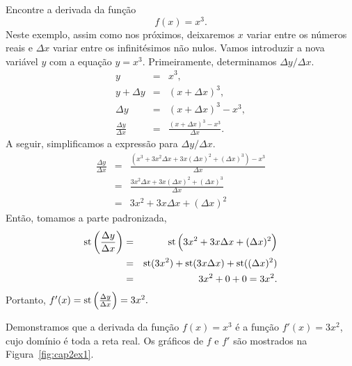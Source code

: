 \begin{example}
\label{ex:cap2ex1}
Encontre a derivada da função
$$
  f(x) = x^3.
$$
Neste exemplo, assim como nos próximos, deixaremos $x$ variar entre os números
reais e $\Delta{x}$ variar entre os infinitésimos não nulos. Vamos introduzir
a nova variável $y$ com a equação $y=x^3$. Primeiramente, determinamos
$\Delta{y}/\Delta{x}$.
\begin{eqnarray*}
  y           & = & x^3, \\
  y+\Delta{y} & = & (x+\Delta{x})^3, \\
  \Delta{y}   & = & (x+\Delta{x})^3 - x^3, \\
  \frac{\Delta{y}}{\Delta{x}} & = &
    \frac{(x+\Delta{x})^3 - x^3}{\Delta{x}}.
\end{eqnarray*}
A seguir, simplificamos a expressão para $\Delta{y}/\Delta{x}$.
\begin{eqnarray*}
  \frac{\Delta{y}}{\Delta{x}} & = &
    \frac{(x^3+3x^2\Delta{x}+3x(\Delta{x})^2+(\Delta{x})^3)-x^3}
         {\Delta{x}} \\
  & = &
    \frac{3x^2\Delta{x}+3x(\Delta{x})^2+(\Delta{x})^3}
         {\Delta{x}} \\
  & = &
    3x^2+3x\Delta{x}+(\Delta{x})^2
\end{eqnarray*}
Então, tomamos a parte padronizada,
\begin{eqnarray*}
  \operatorname{st}\left(\frac{\Delta{y}}{\Delta{x}}\right) & = &
    \operatorname{st}\left(3x^2+3x\Delta{x}+(\Delta{x})^2\right) \\
  & = &
    \operatorname{st}(3x^2)+\operatorname{st}(3x\Delta{x})+\operatorname{st}((\Delta{x})^2) \\
  & = & 3x^2 + 0 + 0 = 3x^2.
\end{eqnarray*}
Portanto, $f'(x) = \operatorname{st}\left(\frac{\Delta{y}}{\Delta{x}}\right) = 3x^2.$
\end{example}

Demonstramos que a derivada da função $f(x) = x^3$ é a função $f'(x) = 3x^2$,
cujo domínio é toda a reta real. Os gráficos de $f$ e $f'$ são mostrados na
Figura~\ref{fig:cap2ex1}.


